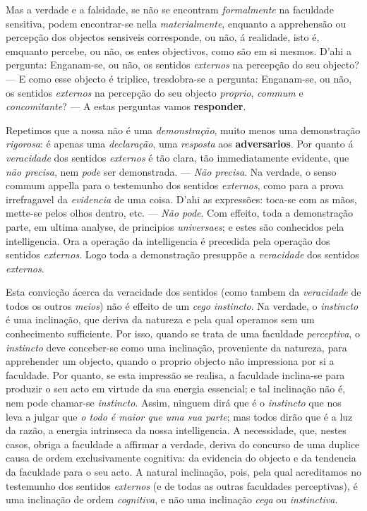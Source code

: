 Mas a verdade e a falsidade, se não se encontram \emph{formalmente} na faculdade sensitiva, podem encontrar-se nella \emph{materialmente}, enquanto a apprehensão ou percepção dos objectos sensiveis corresponde, ou não, á realidade, isto é, emquanto percebe, ou não, os entes objectivos, como são em si mesmos. D'ahi a pergunta: Enganam-se, ou não, os sentidos \emph{externos} na percepção do seu objecto? --- E como esse objecto é triplice, tresdobra-se a pergunta: Enganam-se, ou não, os sentidos \emph{externos} na percepção do seu objecto \emph{proprio}, \emph{commum} e \emph{concomitante}? --- A estas perguntas vamos \textbf{responder}.

Repetimos que a nossa não é uma \emph{demonstração}, muito menos uma demonstração \emph{rigorosa}: é apenas uma \emph{declaração}, uma \emph{resposta} aos \textbf{adversarios}. Por quanto á \emph{veracidade} dos sentidos \emph{externos} é tão clara, tão immediatamente evidente, que \emph{não precisa}, nem \emph{pode} ser demonstrada. --- \emph{Não precisa}. Na verdade, o senso commum appella para o testemunho dos sentidos \emph{externos}, como para a prova irrefragavel da \emph{evidencia} de uma coisa. D'ahi as expressões: toca-se com as mãos, mette-se pelos olhos dentro, etc. --- \emph{Não pode}. Com effeito, toda a demonstração parte, em ultima analyse, de principios \emph{universaes}; e estes são conhecidos pela intelligencia. Ora a operação da intelligencia é precedida pela operação dos sentidos \emph{externos}. Logo toda a demonstração presuppõe a \emph{veracidade} dos sentidos \emph{externos}.

Esta convicção ácerca da veracidade dos sentidos (como tambem da \emph{veracidade} de todos os outros \emph{meios}) não é effeito de um \emph{cego instincto}. Na verdade, o \emph{instincto} é uma inclinação, que deriva da natureza e pela qual operamos sem um conhecimento sufficiente. Por isso, quando se trata de uma faculdade \emph{perceptiva}, o \emph{instincto} deve conceber-se como uma inclinação, proveniente da natureza, para apprehender um objecto, quando o proprio objecto não impressiona por si a faculdade. Por quanto, se esta impressão se realisa, a faculdade inclina-se para produzir o seu acto em virtude da sua energia essencial; e tal inclinação não é, nem pode chamar-se \emph{instincto}. Assim, ninguem dirá que é o \emph{instincto} que nos leva a julgar que \emph{o todo é maior que uma sua parte}; mas todos dirão que é a luz da razão, a energia intrinseca da nossa intelligencia. A necessidade, que, nestes casos, obriga a faculdade a affirmar a verdade, deriva do concurso de uma duplice causa de ordem exclusivamente cognitiva: da evidencia do objecto e da tendencia da faculdade para o seu acto. A natural inclinação, pois, pela qual acreditamos no testemunho dos sentidos \emph{externos} (e de todas as outras faculdades perceptivas), é uma inclinação de ordem \emph{cognitiva}, e não uma inclinação \emph{cega} ou \emph{instinctiva}.


